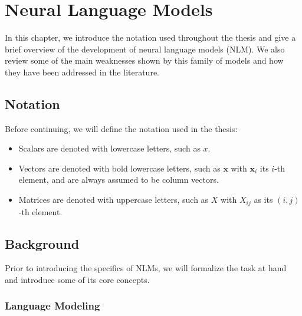\chapter{Neural Language Models}

In this chapter, we introduce the notation used throughout the thesis and give a brief overview of the development of neural language models (NLM). We also review some of the main weaknesses shown by this family of models and how they have been addressed in the literature. 


\section{Notation}
\label{sec:notation}

Before continuing, we will define the notation used in the thesis:

\begin{itemize}
	\item Scalars are denoted with lowercase letters, such as $x$.
	
	\item Vectors are denoted with bold lowercase letters, such as $\mathbf{x}$ with $\mathbf{x}_i$ its $i$-th element, and are always assumed to be column vectors.
	
	\item Matrices are denoted with uppercase letters, such as $X$ with $X_{ij}$ as its $(i,j)$-th element.
\end{itemize}

\section{Background}
\label{sec:background}

Prior to introducing the specifics of NLMs, we will formalize the task at hand and introduce some of its core concepts. 

\subsection{Language Modeling}

